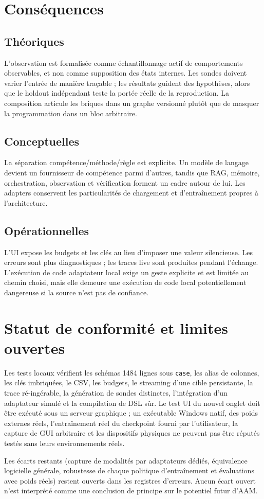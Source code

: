\documentclass[11pt,a4paper]{article}
\begin{document}
\section{Conséquences}
\subsection{Théoriques}
L'observation est formalisée comme échantillonnage actif de comportements observables, et non comme supposition des états internes. Les sondes doivent varier l'entrée de manière traçable ; les résultats guident des hypothèses, alors que le holdout indépendant teste la portée réelle de la reproduction. La composition articule les briques dans un graphe versionné plutôt que de masquer la programmation dans un bloc arbitraire.
\subsection{Conceptuelles}
La séparation compétence/méthode/règle est explicite. Un modèle de langage devient un fournisseur de compétence parmi d'autres, tandis que RAG, mémoire, orchestration, observation et vérification forment un cadre autour de lui. Les adapters conservent les particularités de chargement et d'entraînement propres à l'architecture.
\subsection{Opérationnelles}
L'UI expose les budgets et les clés au lieu d'imposer une valeur silencieuse. Les erreurs sont plus diagnostiques ; les traces live sont produites pendant l'échange. L'exécution de code adaptateur local exige un geste explicite et est limitée au chemin choisi, mais elle demeure une exécution de code local potentiellement dangereuse si la source n'est pas de confiance.

\section{Statut de conformité et limites ouvertes}
Les tests locaux vérifient les schémas 1484 lignes sous \verb|case|, les alias de colonnes, les clés imbriquées, le CSV, les budgets, le streaming d'une cible persistante, la trace ré-ingérable, la génération de sondes distinctes, l'intégration d'un adaptateur simulé et la compilation de DSL sûr. Le test UI du nouvel onglet doit être exécuté sous un serveur graphique ; un exécutable Windows natif, des poids externes réels, l'entraînement réel du checkpoint fourni par l'utilisateur, la capture de GUI arbitraire et les dispositifs physiques ne peuvent pas être réputés testés sans leurs environnements réels.

Les écarts restants (capture de modalités par adaptateurs dédiés, équivalence logicielle générale, robustesse de chaque politique d'entraînement et évaluations avec poids réels) restent ouverts dans les registres d'erreurs. Aucun écart ouvert n'est interprété comme une conclusion de principe sur le potentiel futur d'AAM.
\end{document}
